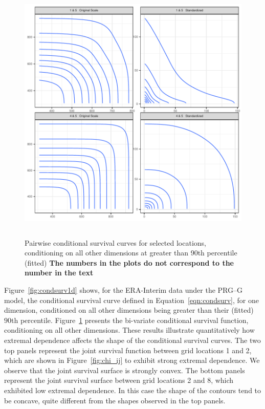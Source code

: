 \begin{figure}[htb]
    \centering
    \caption{Pairwise conditional survival curves for selected locations, conditioning on all other dimensions at greater than 90th percentile (fitted)\label{fig:condsurv2d} {\bf The numbers in the plots do not correspond to the number in the text}}
    \includegraphics[height=5in, width=5in]{./images/condsurv_2d}
\end{figure}

Figure~\ref{fig:condsurv1d} shows, for the ERA-Interim data under the PRG--G model,  
    the conditional survival curve defined in Equation~\ref{eqn:condsurv}, for one dimension, 
    conditioned on all other dimensions being greater than their (fitted) $90$th percentile. 
    Figure~\ref{fig:condsurv2d} presents the bi-variate conditional survival function,
    conditioning on all other dimensions.  These results illustrate quantitatively how extremal dependence
    affects the shape of the conditional survival curves.  The two top panels represent the joint survival function 
    between grid locations 1 and 2, which are shown in Figure~\ref{fig:chi_ij} to exhibit strong
    extremal dependence.  We observe that the joint survival surface 
    is strongly convex.  The bottom panels represent the joint survival surface between grid locations 2 and 8, 
    which exhibited low extremal dependence.  In this case the shape of the contours tend to be concave, quite different from the shapes observed in the top panels.
